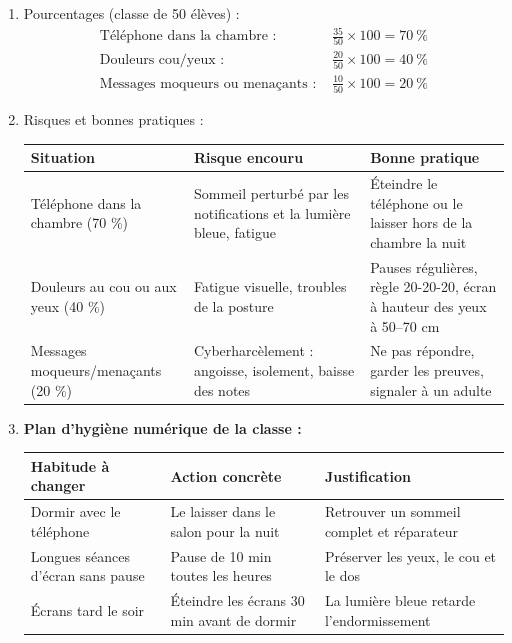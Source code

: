 \documentclass[11pt]{article}
\begin{document}
\begin{corrige}
\begin{enumerate}
\item Pourcentages (classe de 50 élèves) :
\begin{align*}
\text{Téléphone dans la chambre : } & \frac{35}{50} \times 100 = 70\ \% \\
\text{Douleurs cou/yeux : } & \frac{20}{50} \times 100 = 40\ \% \\
\text{Messages moqueurs ou menaçants : } & \frac{10}{50} \times 100 = 20\ \%
\end{align*}
\item Risques et bonnes pratiques :
\begin{center}
\begin{tabularx}{\linewidth}{|X|X|X|}
\hline
\rowcolor{popblueL} \textbf{Situation} & \textbf{Risque encouru} & \textbf{Bonne pratique} \\
\hline
Téléphone dans la chambre (70 \%) & Sommeil perturbé par les notifications et la lumière bleue, fatigue & Éteindre le téléphone ou le laisser hors de la chambre la nuit \\
\hline
Douleurs au cou ou aux yeux (40 \%) & Fatigue visuelle, troubles de la posture & Pauses régulières, règle 20-20-20, écran à hauteur des yeux à 50--70 cm \\
\hline
Messages moqueurs/menaçants (20 \%) & Cyberharcèlement : angoisse, isolement, baisse des notes & Ne pas répondre, garder les preuves, signaler à un adulte \\
\hline
\end{tabularx}
\end{center}
\item \textbf{Plan d'hygiène numérique de la classe :}
\begin{center}
\begin{tabularx}{\linewidth}{|X|X|X|}
\hline
\rowcolor{popblueL} \textbf{Habitude à changer} & \textbf{Action concrète} & \textbf{Justification} \\
\hline
Dormir avec le téléphone & Le laisser dans le salon pour la nuit & Retrouver un sommeil complet et réparateur \\
\hline
Longues séances d'écran sans pause & Pause de 10 min toutes les heures & Préserver les yeux, le cou et le dos \\
\hline
Écrans tard le soir & Éteindre les écrans 30 min avant de dormir & La lumière bleue retarde l'endormissement \\

\end{tabularx}
\end{center}
\end{enumerate}
\end{corrige}
\end{document}

